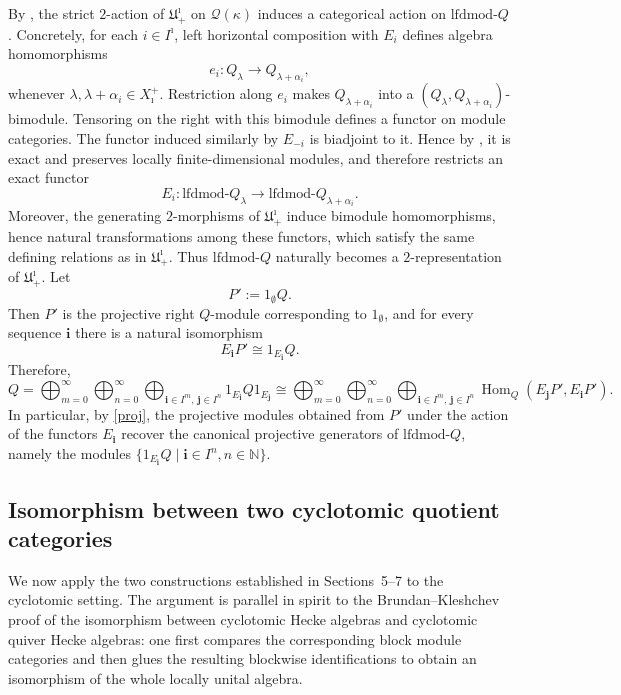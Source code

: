 \documentclass[a4,10pt]{amsart}
\numberwithin{equation}{section}
\def\Hom{\operatorname{Hom}}
\theoremstyle{definition}
\begin{document}

By \cite[Construction~4.26]{BD-cate}, the strict $2$-action of 
$\mathfrak U^\imath_+$ on $\mathcal Q(\kappa)$ induces a categorical action
on $\mathrm{lfdmod}\text{-}Q$. Concretely, for each $i\in I^\imath$, left 
horizontal composition with $E_i$ defines algebra homomorphisms
\[
e_i: Q_\lambda \to Q_{\lambda+\alpha_i},
\]
whenever $\lambda, \lambda+\alpha_i \in X_\imath^+$. Restriction along $e_i$
 makes $Q_{\lambda+\alpha_i}$ into  a $(Q_\lambda, Q_{\lambda+\alpha_i})$-bimodule. Tensoring on the
right with this bimodule defines a functor on module categories. The functor induced similarly by $E_{-i}$ is biadjoint to it. Hence by \cite[Theorem~2.11]{BD-cate}, it is exact and preserves locally finite-dimensional modules, and therefore restricts an exact functor
\[
E_i: \mathrm{lfdmod}\text{-}Q_\lambda \longrightarrow \mathrm{lfdmod}\text{-}Q_{\lambda+\alpha_i}.
\]
Moreover, the generating $2$-morphisms of $\mathfrak U^\imath_+$ induce 
bimodule homomorphisms, hence natural transformations among these functors,
which satisfy the same defining relations as in $\mathfrak U^\imath_+$. 
Thus $\mathrm{lfdmod}\text{-}Q$ naturally becomes a $2$-representation of 
$\mathfrak U^\imath_+$. Let 
\[
P' := 1_\emptyset Q.
\]
Then $P'$ is the projective right $Q$-module corresponding to $1_\emptyset$, 
and for every sequence $\mathbf i$ there is a natural isomorphism
\begin{equation}\label{proj}
E_\mathbf i P' \cong 1_{E_\mathbf i} Q.
\end{equation}
Therefore,
\begin{equation}\label{equ:decomofQ}
Q = \bigoplus_{m=0}^\infty \bigoplus_{n=0}^\infty 
\bigoplus_{\mathbf i \in I^m,\, \mathbf j \in I^n} 
1_{E_\mathbf i} Q 1_{E_\mathbf j} 
\cong 
\bigoplus_{m=0}^\infty \bigoplus_{n=0}^\infty 
\bigoplus_{\mathbf i \in I^m,\, \mathbf j \in I^n} 
\Hom_Q(E_\mathbf j P', E_\mathbf i P').
\end{equation}
In particular, by \eqref{proj}, the projective modules obtained from $P'$ under 
the action of the functors $E_\mathbf i$ recover the canonical projective generators
of $\mathrm{lfdmod}\text{-}Q$, namely the modules 
\(\{ 1_{E_\mathbf i} Q \mid \mathbf i \in I^n, n\in \mathbb N \}\).


\subsection{Isomorphism between two cyclotomic quotient categories}
We now apply the two constructions established in Sections~5--7 to the
cyclotomic setting. The argument is parallel in spirit to the
Brundan--Kleshchev proof of the isomorphism between cyclotomic Hecke algebras
and cyclotomic quiver Hecke algebras: one first compares the corresponding
block module categories and then glues the resulting blockwise identifications
to obtain an isomorphism of the whole locally unital algebra.
\end{document}
